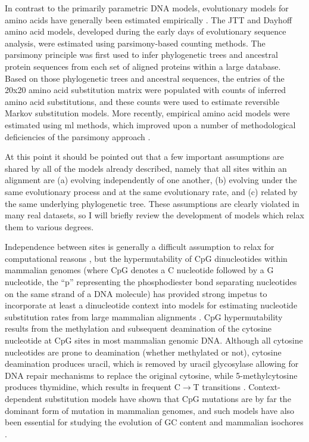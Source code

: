 In contrast to the primarily parametric DNA models, evolutionary
models for amino acids have generally been estimated empirically
\citep{Whelan2001}. The JTT \citep{Jones1992} and Dayhoff
\citep{Dayhoff1978} amino acid models, developed during the early days
of evolutionary sequence analysis, were estimated using
parsimony-based counting methods. The parsimony principle was first
used to infer phylogenetic trees and ancestral protein sequences from
each set of aligned proteins within a large database. Based on those
phylogenetic trees and ancestral sequences, the entries of the 20x20
amino acid substitution matrix were populated with counts of inferred
amino acid substitutions, and these counts were used to estimate
reversible Markov substitution models. More recently, empirical amino
acid models were estimated using \ac{ml} methods, which improved upon
a number of methodological deficiencies of the parsimony approach
\citep{Adachi1996,Whelan2001b}.

At this point it should be pointed out that a few important
assumptions are shared by all of the models already described, namely
that all sites within an alignment are (a) evolving independently of
one another, (b) evolving under the same evolutionary process and at
the same evolutionary rate, and (c) related by the same underlying
phylogenetic tree. These assumptions are clearly violated in many real
datasets, so I will briefly review the development of models which
relax them to various degrees.

Independence between sites is generally a difficult assumption to
relax for computational reasons \citep{Kosiol2006c}, but the
hypermutability of CpG dinucleotides within mammalian genomes (where
CpG denotes a C nucleotide followed by a G nucleotide, the ``p''
representing the phosphodiester bond separating nucleotides on the
same strand of a DNA molecule) has provided strong impetus to
incorporate at least a dinucleotide context into models for estimating
nucleotide substitution rates from large mammalian alignments
\citep{Blake1992,Hwang2004a,Siepel2004a}. CpG hypermutability results
from the methylation and subsequent deamination of the cytosine
nucleotide at CpG sites in most mammalian genomic DNA. Although all
cytosine nucleotides are prone to deamination (whether methylated or
not), cytosine deamination produces uracil, which is removed by uracil
glycosylase allowing for DNA repair mechanisms to replace the original
cytosine, while 5-methylcytosine produces thymidine, which results in
frequent C$\to$T transitions
\citep{Ehrlich1982,Hwang2004a}. Context-dependent substitution models
have shown that CpG mutations are by far the dominant form of mutation
in mammalian genomes, and such models have also been essential for
studying the evolution of GC content and mammalian isochores
\citep{Duret2006,Duret2008}.

